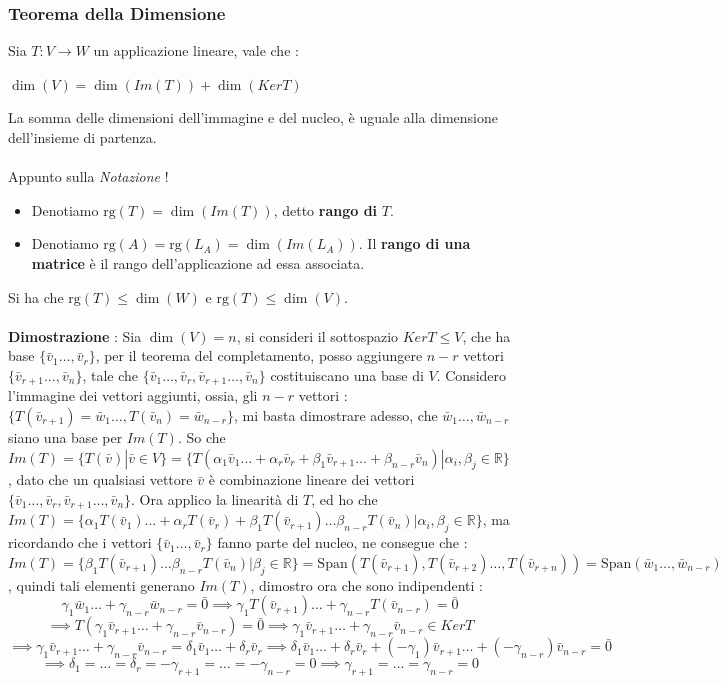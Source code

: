 \documentclass[12pt, letterpaper]{article}
\newcommand{\R}{{\mathbb R}}
\newcommand{\rg}{{\text{rg}}}
\newcommand{\ve}{{\bar v}}
\newcommand{\acc}{\\\hphantom{}\\}
\newcommand{\Span}{{\text{Span}}}
\begin{document}
\subsubsection{Teorema della Dimensione}\label{teoDim}
Sia \(T:V\rightarrow W\) un applicazione lineare, vale che :\begin{center}
    \(\dim(V)=\dim(Im(T))+\dim(KerT)\)
\end{center}
La somma delle dimensioni dell'immagine e del nucleo, è uguale alla dimensione dell'insieme di partenza.\acc
    Appunto sulla \textit{Notazione} ! \begin{itemize}
        \item Denotiamo \(\rg(T)=\dim(Im(T))\), detto \textbf{rango di }\(T\).
        \item Denotiamo \(\rg(A)=\rg(L_A)=\dim(Im(L_A))\). Il \textbf{rango di una matrice} è il rango dell'applicazione ad essa associata.
    \end{itemize}
Si ha che \(\rg(T)\le \dim(W)\) e \(\rg(T)\le\dim(V)\).\acc 
\textbf{Dimostrazione }: 
Sia \(\dim(V)=n\), si consideri il sottospazio \(KerT\le V\), che ha base \(\{\ve_1\dots,\ve_r\}\), per il teorema del completamento, posso aggiungere 
\(n-r\) vettori \(\{\ve_{r+1}\dots,\ve_n\}\), tale che \(\{\ve_1\dots,\ve_r,\ve_{r+1}\dots,\ve_n\}\) costituiscano una base 
di \(V\). Considero l'immagine dei vettori aggiunti, ossia, gli \(n-r\) vettori : \(\{T(\ve_{r+1})=\bar w_1\dots,T(\ve_n)=\bar w_{n-r}\}\),
mi basta dimostrare adesso, che \(\bar w_1\dots,\bar w_{n-r}\) siano una base per \(Im(T)\). So che \(Im(T)=\{T(\ve)|\ve\in V\}=
\{T(\alpha_1\ve_1\dots +\alpha_r\ve_r+\beta_1\ve_{r+1}\dots+\beta_{n-r}\ve_n)|\alpha_i,\beta_j\in\R\}\), dato che 
un qualsiasi vettore \(\ve\) è combinazione lineare dei vettori  \(\{\ve_1\dots,\ve_r,\ve_{r+1}\dots,\ve_n\}\). Ora applico la linearità
di \(T\), ed ho che \(Im(T)=\{\alpha_1T(\ve_1)\dots+\alpha_rT(\ve_r)+\beta_1T(\ve_{r+1})\dots\beta_{n-r}T(\ve_n)|\alpha_i,\beta_j\in\R\}\), ma 
ricordando che i vettori  \(\{\ve_1\dots,\ve_r\}\) fanno parte del nucleo, ne consegue che : 
\(Im(T)=\{\beta_1T(\ve_{r+1})\dots\beta_{n-r}T(\ve_n)|\beta_j\in\R\}=\Span(T(\ve_{r+1}),T(\ve_{r+2})\dots,T(\ve_{r+n}))=
\Span(\bar w_1\dots,\bar w_{n-r})\), quindi tali elementi generano \(Im(T)\), dimostro ora che sono indipendenti : \begin{equation}
    \gamma_1\bar w_1\dots +\gamma_{n-r}\bar w_{n-r}=\bar0\implies\gamma_1T(\ve_{r+1})\dots+\gamma_{n-r}T(\ve_{n-r})=\bar0
\end{equation}\begin{equation}\implies T(\gamma_1\ve_{r+1}\dots+\gamma_{n-r}\ve_{n-r})=\bar 0 \implies \gamma_1\ve_{r+1}\dots+\gamma_{n-r}\ve_{n-r}\in KerT 
\end{equation}\begin{equation} \implies \gamma_1\ve_{r+1}\dots+\gamma_{n-r}\ve_{n-r}=\delta_1 \ve_1\dots +\delta_r\ve_r\implies 
    \delta_1 \ve_1\dots +\delta_r\ve_r +(- \gamma_1)\ve_{r+1}\dots+(-\gamma_{n-r})\ve_{n-r}=\bar 0 
\end{equation}\begin{equation}\implies \delta_1=\dots = \delta_r=-\gamma_{r+1}=\dots=-\gamma_{n-r}=0 \implies \gamma_{r+1}=\dots=\gamma_{n-r}=0
\end{equation}
\end{document}
